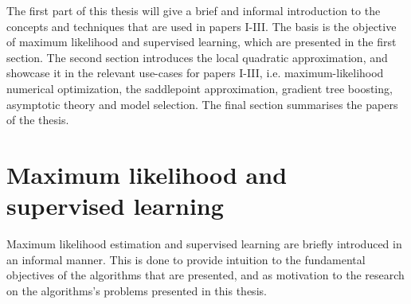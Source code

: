 The first part of this thesis will give a brief and informal introduction to the concepts and techniques that are used in papers I-III.
The basis is the objective of maximum likelihood and supervised learning, which are presented in the first section.
The second section introduces the local quadratic approximation, and showcase it in the relevant use-cases for papers I-III, i.e. maximum-likelihood numerical optimization, the saddlepoint approximation, gradient tree boosting, asymptotic theory and model selection.
The final section summarises the papers of the thesis.
%
%
%
%
%
%
%
%
%
%
%

\chapter{Maximum likelihood and supervised learning}

Maximum likelihood estimation and supervised learning are briefly introduced in an informal manner. %
This is done to provide intuition to the fundamental objectives of the algorithms that are presented, and as motivation to the research on the algorithms's problems presented in this thesis.

